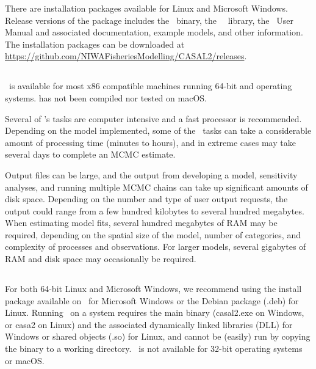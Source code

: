There are installation packages available for Linux and Microsoft Windows. Release versions of the package includes the \CNAME\ binary, the \CNAME\ \R\ library, the \CNAME\ User Manual and associated documentation, example models, and other information. The installation packages can be downloaded at \url{https://github.com/NIWAFisheriesModelling/CASAL2/releases}.

\subsection{}

\CNAME\ is available for most x86 compatible machines running 64-bit  and  operating systems. \CNAME has not been compiled nor tested on macOS.

Several of \CNAME's tasks are computer intensive and a fast processor is recommended. Depending on the model implemented, some of the \CNAME\ tasks can take a considerable amount of processing time (minutes to hours), and in extreme cases may take several days to complete an MCMC estimate. 

Output files can be large, and the output from developing a model, sensitivity analyses, and running multiple MCMC chains can take up significant amounts of disk space. Depending on the number and type of user output requests, the output could range from a few hundred kilobytes to several hundred megabytes. When estimating model fits, several hundred megabytes of RAM may be required, depending on the spatial size of the model, number of categories, and complexity of processes and observations. For larger models, several gigabytes of RAM and disk space may occasionally be required. 

\subsection{}

For both 64-bit Linux and Microsoft Windows, we recommend using the install package available on \github\ for Microsoft Windows or the Debian package (.deb) for Linux. Running \CNAME\ on a system requires the main binary (casal2.exe on Windows, or casa2 on Linux) and the associated dynamically linked libraries (DLL) for Windows or shared objects (.so) for Linux, and cannot be (easily) run by copying the binary to a working directory. \CNAME\ is not available for 32-bit operating systems or macOS.

